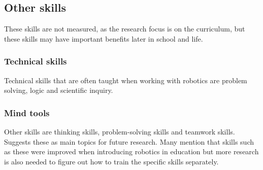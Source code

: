 \subsection{Other skills}
These skills are not measured, as the research focus is on the curriculum, but these skills may have important benefits later in school and life.

\subsubsection{Technical skills}
Technical skills that are often taught when working with robotics are problem solving, logic and scientific inquiry. 

\subsubsection{Mind tools}
Other skills are thinking skills, problem-solving skills and teamwork skills. \cite{Benitti2012978} Suggests these as main topics for future research. Many mention that skills such as these were improved when introducing robotics in education but more research is also needed to figure out how to train the specific skills separately. 